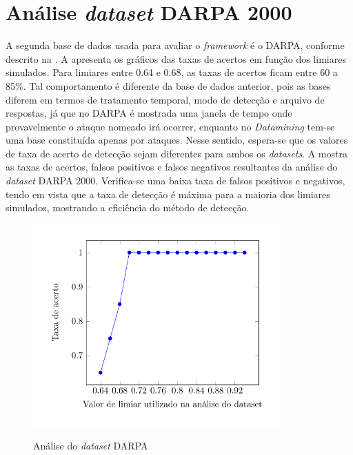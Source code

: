\section{Análise \textit{dataset} DARPA 2000}
A segunda base de dados usada para avaliar o \textit{framework} é o DARPA, conforme descrito na .
A  apresenta os gráficos das taxas de acertos em função dos limiares simulados. Para limiares entre 0.64 e 0.68, as taxas de acertos ficam entre 60 a 85\%. Tal comportamento é diferente da base de dados anterior, pois as bases diferem em termos de tratamento temporal, modo de detecção e arquivo de respostas, já que no DARPA é mostrada uma janela de tempo onde provavelmente o ataque nomeado irá ocorrer, enquanto no \textit{Datamining} tem-se uma base constituída apenas por ataques. Nesse sentido, espera-se que os valores de taxa de acerto de detecção sejam diferentes para ambos os \textit{datasets}. A  mostra as taxas de acertos, falsos positivos e falsos negativos resultantes da análise do \textit{dataset} DARPA 2000. Verifica-se uma baixa taxa de falsos positivos e negativos, tendo em vista que a taxa de detecção é máxima para a maioria dos limiares simulados, mostrando a eficiência do método de detecção.       
 \begin{figure}[htb]
 	\centering
 	\caption{Análise do \textit{dataset} DARPA }
 	\includegraphics[width=0.85\textwidth]{figs/resultsDarpa.pdf}\\
 	\label{fig:ResultsDarpa}
 \end{figure}
 
